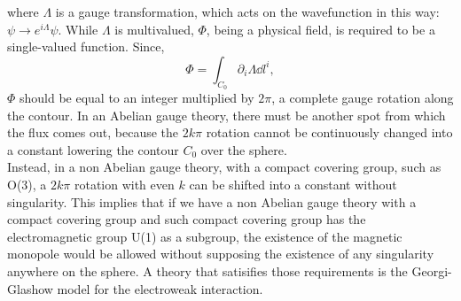 \documentclass[main.tex]{subfiles}
\begin{document}
where $\Lambda$ is a gauge transformation, which acts on the wavefunction in this way: $\psi \rightarrow e^{i\Lambda} \psi $. 
While $\Lambda$ is multivalued, $\Phi$, being a physical field, is required to be a single-valued function. Since, 
\begin{equation}
    \Phi = \int_{C_0} \partial_i \Lambda \dd{l}^i,
\end{equation} 
$\Phi$ should be equal to an integer multiplied by $2 \pi  $, a complete gauge rotation along the contour. 
In an Abelian gauge theory, there must be another spot from which the flux comes out, because the $2k \pi$ rotation cannot be continuously changed into a constant lowering the contour $C_0$ over the sphere. \\ 
Instead, in a non Abelian gauge theory, with a compact covering group, such as O(3), a $2k\pi$ rotation with even $k$ can be shifted into a constant without singularity.
This implies that if we have a non Abelian gauge theory with a compact covering group and such compact covering group has the electromagnetic group U(1) as a subgroup, the existence of the magnetic monopole would be allowed without supposing the existence of any singularity anywhere on the sphere.
A theory that satisifies those requirements is the Georgi-Glashow model for the electroweak interaction.
\end{document}

